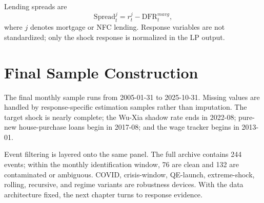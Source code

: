 Lending spreads are
\begin{equation}
  \mathrm{Spread}^{j}_{t}
  =
  r^{j}_{t}
  -
  \mathrm{DFR}^{mavg}_{t},
  \label{eq:lending-spread}
\end{equation}
where \(j\) denotes mortgage or NFC lending. Response variables are not standardized; only the shock response is normalized in the LP output.

\section{Final Sample Construction}

The final monthly sample runs from 2005-01-31 to 2025-10-31. Missing values are handled by response-specific estimation samples rather than imputation. The target shock is nearly complete; the Wu-Xia shadow rate ends in 2022-08; pure-new house-purchase loans begin in 2017-08; and the wage tracker begins in 2013-01.

Event filtering is layered onto the same panel. The full archive contains 244 events; within the monthly identification window, 76 are clean and 132 are contaminated or ambiguous. COVID, crisis-window, QE-launch, extreme-shock, rolling, recursive, and regime variants are robustness devices. With the data architecture fixed, the next chapter turns to response evidence.
